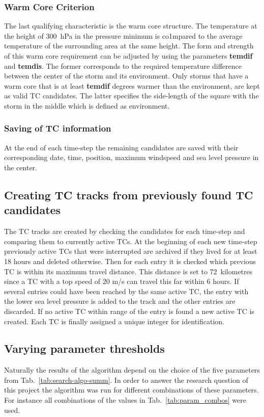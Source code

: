 \subsubsection*{Warm Core Criterion}
The last qualifying characteristic is the warm core structure. The temperature
at the height of 300~hPa in the pressure minimum is co1mpared to the average
temperature of the surrounding area at the same height. The form and strength
of this warm core requirement can be adjusted by using the parameters
\textbf{temdif} and \textbf{temdis}. The former corresponds to the required
temperature difference between the center of the storm and its environment.
Only storms that have a warm core that is at least \textbf{temdif} degrees
warmer than the environment, are kept as valid TC candidates. The latter
specifies the side-length of the square with the storm in the middle which is
defined as environment.

\subsubsection*{Saving of TC information}
At the end of each time-step the remaining candidates are saved with their
corresponding date, time, position, maximum windspeed and sea level pressure in
the center.

\subsection{Creating TC tracks from previously found TC candidates}
The TC tracks are created by checking the candidates for each time-step and
comparing them to currently active TCs. At the beginning of each new time-step
previously active TCs that were interrupted are archived if they lived for at
least 18 hours and deleted otherwise. Then for each entry it is checked which
previous TC is within its maximum travel distance. This distance is set to
72~kilometres since a TC with a top speed of 20 m/s can travel this far within
6 hours. If several entries could have been reached by the same active TC, the
entry with the lower sea level pressure is added to the track and the other
entries are discarded. If no active TC within range of the entry is found a new
active TC is created. Each TC is finally assigned a unique integer for
identification.

\subsection{Varying parameter thresholds}
Naturally the results of the algorithm depend on the choice of the five
parameters from Tab.~\ref{tab:search-algo-summ}. In order to answer the
research question of this project the algorithm was run for different
combinations of these parameters. For instance all combinations of the values
in Tab.~\ref{tab:param_combos} were used.


